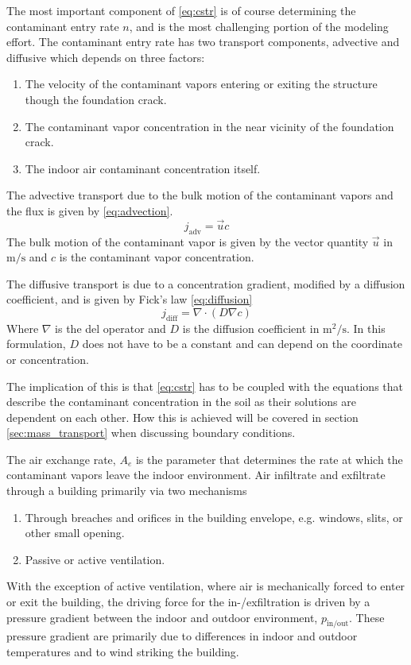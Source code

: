 The most important component of \eqref{eq:cstr} is of course determining the contaminant entry rate $n$, and is the most challenging portion of the modeling effort.
The contaminant entry rate has two transport components, advective and diffusive which depends on three factors:
\begin{enumerate}
  \item The velocity of the contaminant vapors entering or exiting the structure though the foundation crack.
  \item The contaminant vapor concentration in the near vicinity of the foundation crack.
  \item The indoor air contaminant concentration itself.
\end{enumerate}
The advective transport due to the bulk motion of the contaminant vapors and the flux is given by \eqref{eq:advection}.
\begin{equation}\label{eq:advection} %
  j_\mathrm{adv} = \vec{u} c
\end{equation}
The bulk motion of the contaminant vapor is given by the vector quantity $\vec{u}$ in $\mathrm{m/s}$ and $c$ is the contaminant vapor concentration.\par

The diffusive transport is due to a concentration gradient, modified by a diffusion coefficient, and is given by Fick's law \eqref{eq:diffusion}
\begin{equation}\label{eq:diffusion}
  j_\mathrm{diff} = \nabla \cdot (D\nabla c)
\end{equation}
Where $\nabla$ is the del operator and $D$ is the diffusion coefficient in $\mathrm{m^2/s}$.
In this formulation, $D$ does not have to be a constant and can depend on the coordinate or concentration.\par

The implication of this is that \eqref{eq:cstr} has to be coupled with the equations that describe the contaminant concentration in the soil as their solutions are dependent on each other.
How this is achieved will be covered in section \ref{sec:mass_transport} when discussing boundary conditions.\par

The air exchange rate, $A_e$ is the parameter that determines the rate at which the contaminant vapors leave the indoor environment.
Air infiltrate and exfiltrate through a building primarily via two mechanisms
\begin{enumerate}
  \item Through breaches and orifices in the building envelope, e.g. windows, slits, or other small opening.
  \item Passive or active ventilation.
\end{enumerate}
With the exception of active ventilation, where air is mechanically forced to enter or exit the building, the driving force for the in-/exfiltration is driven by a pressure gradient between the indoor and outdoor environment, $p_\mathrm{in/out}$.
These pressure gradient are primarily due to differences in indoor and outdoor temperatures and to wind striking the building.\par

